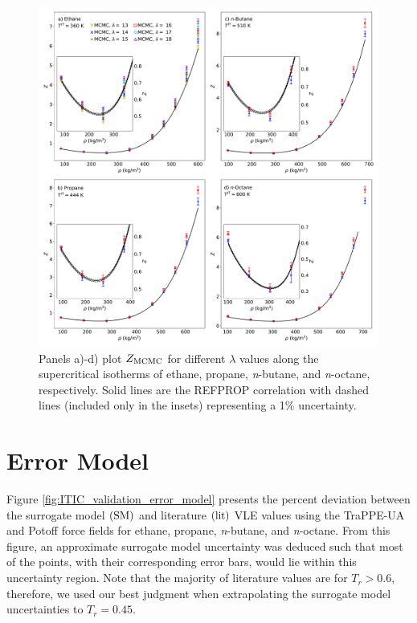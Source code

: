 \documentclass[journal=jctc,manuscript=article]{achemso}
\begin{document}
\begin{figure}[p!]
	\centering
	\includegraphics[width=6.4in]{MCMC_Mie_ZIT_alkanes}
	\caption{Panels a)-d) plot $Z_{\rm MCMC}$ for different $\lambda$ values along the supercritical isotherms of ethane, propane, \textit{n}-butane, and \textit{n}-octane, respectively. Solid lines are the REFPROP correlation with dashed lines (included only in the insets) representing a 1\% uncertainty.}
	\label{fig:MCMC_Mie_ZIT_alkanes}
\end{figure} 

\newpage

\section{Error Model} \label{Error Model}

Figure \ref{fig:ITIC_validation_error_model} presents the percent deviation between the surrogate model $(\rm SM)$ and literature $(\rm lit)$ VLE values using the TraPPE-UA and Potoff force fields for ethane, propane, \textit{n}-butane, and \textit{n}-octane. From this figure, an approximate surrogate model uncertainty was deduced such that most of the points, with their corresponding error bars, would lie within this uncertainty region. Note that the majority of literature values are for $T_r > 0.6$, therefore, we used our best judgment when extrapolating the surrogate model uncertainties to $T_r = 0.45$. 
\end{document}
